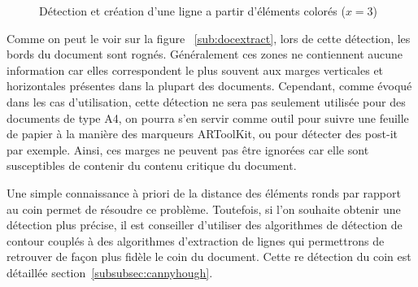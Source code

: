 \begin{figure}[H]
\centering
      \caption{Détection et création d'une ligne a partir d'éléments colorés ($x = 3$)}
      \label{fig:doc:linecluster}
\end{figure}

Comme on peut le voir sur la figure ~\ref{sub:docextract}, lors de cette détection, les bords du document sont rognés. Généralement ces zones ne contiennent aucune information car elles correspondent le plus souvent aux marges verticales et horizontales présentes dans la plupart des documents. Cependant, comme évoqué dans les cas d'utilisation, cette détection ne sera pas seulement utilisée pour des documents de type A4, on pourra s'en servir comme outil pour suivre une feuille de papier à la manière des marqueurs ARToolKit, ou pour détecter des post-it par exemple. Ainsi, ces marges ne peuvent pas être ignorées car elle sont susceptibles de contenir du contenu critique du document.

Une simple connaissance à priori de la distance des éléments ronds par rapport au coin permet de résoudre ce problème. Toutefois, si l'on souhaite obtenir une détection plus précise, il est conseiller d'utiliser des algorithmes de détection de contour couplés à des algorithmes d'extraction de lignes qui permettrons de retrouver de façon plus fidèle le coin du document. Cette re détection du coin est détaillée section~\ref{subsubsec:cannyhough}.

